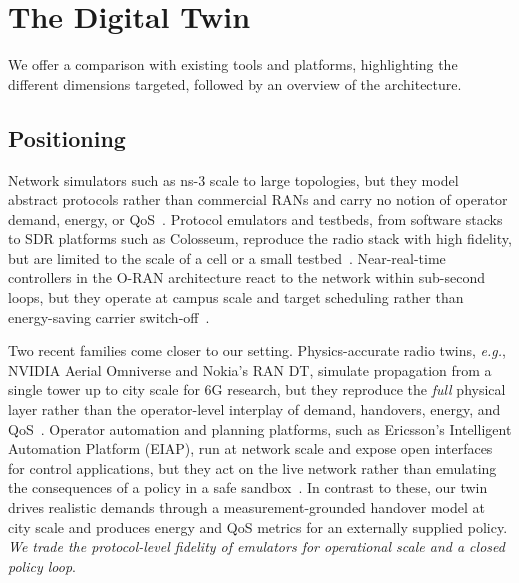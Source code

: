 \documentclass[sigconf, 10pt, anonymous, review]{acmart}
\newcommand{\eg}{\textit{e.g.},\xspace}
\begin{document}
\section{The Digital Twin}
\label{sec:arch}

We offer a comparison with existing tools and platforms, highlighting the different dimensions targeted, followed by an overview of the architecture. 

\subsection{Positioning}
Network simulators such as ns-3 scale to large topologies, but they model abstract protocols rather than commercial \acp{RAN} and carry no notion of operator demand, energy, or QoS~\cite{ns3}.
Protocol emulators and testbeds, from software stacks to SDR platforms such as Colosseum, reproduce the radio stack with high fidelity, but are limited to the scale of a cell or a small testbed~\cite{colosseum}. Near-real-time controllers in the O-RAN architecture react to the network within sub-second loops, but they operate at campus scale and target scheduling rather than energy-saving carrier switch-off~\cite{oran_disrupting}.

Two recent families come closer to our setting. 
Physics-accurate radio twins, \eg NVIDIA Aerial Omniverse and Nokia's \ac{RAN} \ac{DT}, simulate propagation from a single tower up to city scale for 6G research, but they reproduce the \textit{full} physical layer rather than the operator-level interplay of demand, handovers, energy, and \ac{QoS}~\cite{nvidia_aodt, nokia_ran_dt}. 
Operator automation and planning platforms, such as Ericsson's Intelligent Automation Platform (EIAP), run at network scale
and expose open interfaces for control applications, but they act on the live network rather than emulating the consequences of a policy in a safe sandbox~\cite{ericsson_eiap}. 
In contrast to these, our twin drives realistic demands through a measurement-grounded handover model at city scale and produces energy and \ac{QoS} metrics for an externally supplied policy. 
\textit{We trade the protocol-level fidelity of emulators for operational scale and a closed policy loop}. 
\end{document}
